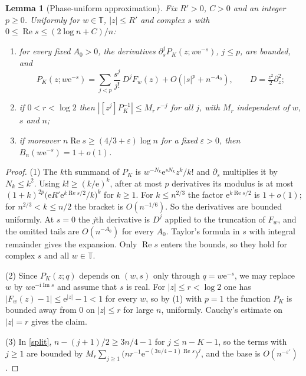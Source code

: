 \documentclass[11pt,a4paper]{article}
\newtheorem{lemma}[theorem]{Lemma}
\theoremstyle{remark}
\newcommand{\coef}[1]{[z^{#1}]}
\newcommand{\T}{\mathbb T}
\newcommand{\e}{\mathrm e}
\newcommand{\ii}{\mathrm i}
\newcommand{\Rea}{\operatorname{Re}}
\newcommand{\Ima}{\operatorname{Im}}
\begin{document}
\begin{lemma}[Phase-uniform approximation]\label{lem:uniform}
Fix $R'>0$, $C>0$ and an integer $p\ge0$. Uniformly for $w\in\T$, $|z|\le R'$ and complex $s$ with $0\le\Rea s\le(2\log n+C)/n$:
\begin{enumerate}
\item for every fixed $A_0>0$, the derivatives $\partial_s^jP_K(z;w\e^{-s})$, $j\le p$, are bounded, and
\[
P_K(z;w\e^{-s})=\sum_{j<p}\frac{s^j}{j!}\,D^jF_w(z)+O(|s|^{p}+n^{-A_0}),\qquad D=\tfrac{z^2}{2}\partial_z^2 ;
\]
\item if $0<r<\log2$ then $|\coef jP_K^{-1}|\le M_r\,r^{-j}$ for all $j$, with $M_r$ independent of $w$, $s$ and $n$;
\item if moreover $n\Rea s\ge(4/3+\varepsilon)\log n$ for a fixed $\varepsilon>0$, then $B_n(w\e^{-s})=1+o(1)$.
\end{enumerate}
\end{lemma}
\begin{proof}
(1) The $k$th summand of $P_K$ is $w^{-N_k}\e^{sN_k}z^k/k!$ and $\partial_s$ multiplies it by $N_k\le k^2$. Using $k!\ge(k/\e)^k$, after at most $p$ derivatives its modulus is at most $(1+k)^{2p}\bigl(\e R'\e^{k\Rea s/2}/k\bigr)^k$ for $k\ge1$. For $k\le n^{2/3}$ the factor $\e^{k\Rea s/2}$ is $1+o(1)$; for $n^{2/3}<k\le n/2$ the bracket is $O(n^{-1/6})$. So the derivatives are bounded uniformly. At $s=0$ the $j$th derivative is $D^j$ applied to the truncation of $F_w$, and the omitted tails are $O(n^{-A_0})$ for every $A_0$. Taylor's formula in $s$ with integral remainder gives the expansion. Only $\Rea s$ enters the bounds, so they hold for complex $s$ and all $w\in\T$.

(2) Since $P_K(z;q)$ depends on $(w,s)$ only through $q=w\e^{-s}$, we may replace $w$ by $w\e^{-\ii\Ima s}$ and assume that $s$ is real. For $|z|\le r<\log2$ one has $|F_w(z)-1|\le\e^{|z|}-1<1$ for every $w$, so by (1) with $p=1$ the function $P_K$ is bounded away from $0$ on $|z|\le r$ for large $n$, uniformly. Cauchy's estimate on $|z|=r$ gives the claim.

(3) In \eqref{split}, $n-(j+1)/2\ge3n/4-1$ for $j\le n-K-1$, so the terms with $j\ge1$ are bounded by $M_r\sum_{j\ge1}\bigl(nr^{-1}\e^{-(3n/4-1)\Rea s}\bigr)^j$, and the base is $O(n^{-\varepsilon'})$.
\end{proof}
\end{document}
